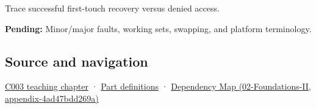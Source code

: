 Trace successful first-touch recovery versus denied access.

\textbf{Pending:} Minor/major faults, working sets, swapping, and platform terminology.

\subsection{Source and navigation}\label{appendix-cc0909a7ef14-source-and-navigation}

\hyperref[01-foundations-i-ch002-where-the-bytes-live]{C003 teaching chapter} · \hyperref[appendix-fd090d982a15-m003---parts-41-60]{Part definitions} · \href{../02-Foundations-II/main.pdf\#nameddest=appendix-4ad47bdd269a}{Dependency Map (02-Foundations-II, appendix-4ad47bdd269a)}
